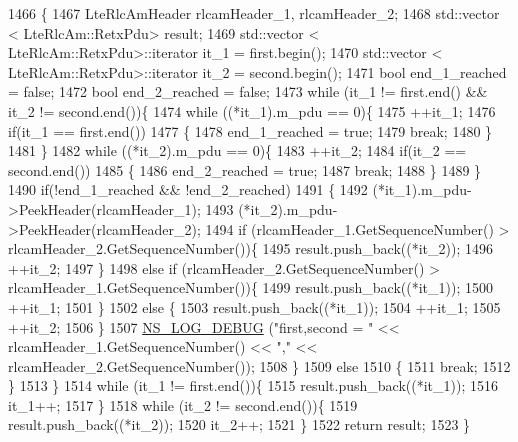 \begin{DoxyCode}
1466 \{
1467   LteRlcAmHeader rlcamHeader\_1, rlcamHeader\_2;
1468   std::vector < LteRlcAm::RetxPdu> result;
1469   std::vector < LteRlcAm::RetxPdu>::iterator it\_1 = first.begin();
1470   std::vector < LteRlcAm::RetxPdu>::iterator it\_2 = second.begin();
1471   \textcolor{keywordtype}{bool} end\_1\_reached = \textcolor{keyword}{false};
1472   \textcolor{keywordtype}{bool} end\_2\_reached = \textcolor{keyword}{false};
1473   \textcolor{keywordflow}{while} (it\_1 != first.end() && it\_2 != second.end())\{
1474     \textcolor{keywordflow}{while} ((*it\_1).m\_pdu == 0)\{
1475       ++it\_1;
1476       \textcolor{keywordflow}{if}(it\_1 == first.end())
1477       \{
1478         end\_1\_reached = \textcolor{keyword}{true};
1479         \textcolor{keywordflow}{break};
1480       \}
1481     \}
1482     \textcolor{keywordflow}{while} ((*it\_2).m\_pdu == 0)\{
1483       ++it\_2;
1484       \textcolor{keywordflow}{if}(it\_2 == second.end())
1485       \{
1486         end\_2\_reached = \textcolor{keyword}{true};
1487         \textcolor{keywordflow}{break};
1488       \}
1489     \}
1490     \textcolor{keywordflow}{if}(!end\_1\_reached && !end\_2\_reached)
1491     \{
1492       (*it\_1).m\_pdu->PeekHeader(rlcamHeader\_1);
1493       (*it\_2).m\_pdu->PeekHeader(rlcamHeader\_2);
1494       \textcolor{keywordflow}{if} (rlcamHeader\_1.GetSequenceNumber() > rlcamHeader\_2.GetSequenceNumber())\{
1495         result.push\_back((*it\_2));  
1496         ++it\_2;       
1497       \}
1498       \textcolor{keywordflow}{else} \textcolor{keywordflow}{if} (rlcamHeader\_2.GetSequenceNumber() > rlcamHeader\_1.GetSequenceNumber())\{
1499         result.push\_back((*it\_1));
1500         ++it\_1;         
1501       \}
1502       \textcolor{keywordflow}{else} \{
1503         result.push\_back((*it\_1));
1504         ++it\_1;
1505         ++it\_2;
1506       \}
1507       \hyperlink{group__logging_ga413f1886406d49f59a6a0a89b77b4d0a}{NS\_LOG\_DEBUG} (\textcolor{stringliteral}{"first,second = "} << rlcamHeader\_1.GetSequenceNumber() << \textcolor{stringliteral}{","} << 
      rlcamHeader\_2.GetSequenceNumber());
1508     \}
1509     \textcolor{keywordflow}{else}
1510     \{
1511       \textcolor{keywordflow}{break};
1512     \}
1513   \}
1514   \textcolor{keywordflow}{while} (it\_1 != first.end())\{
1515     result.push\_back((*it\_1));
1516     it\_1++;
1517   \}
1518   \textcolor{keywordflow}{while} (it\_2 != second.end())\{
1519     result.push\_back((*it\_2));
1520     it\_2++;
1521   \}
1522   \textcolor{keywordflow}{return} result;
1523 \}
\end{DoxyCode}


